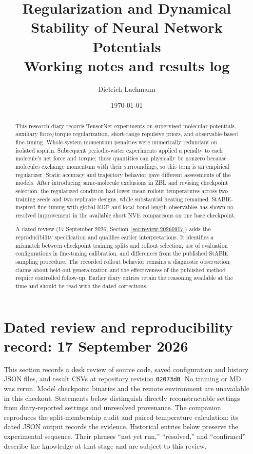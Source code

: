 \documentclass[11pt]{article}
\title{Regularization and Dynamical Stability of Neural Network
Potentials \\ \large Working notes and results log}
\author{Dietrich Lachmann}
\date{\today}
\begin{document}
\maketitle

\begin{abstract}
This research diary records TensorNet experiments on supervised molecular
potentials, auxiliary force/torque regularization, short-range repulsive
priors, and observable-based fine-tuning. Whole-system momentum penalties
were numerically redundant on isolated aspirin. Subsequent periodic-water
experiments applied a penalty to each molecule's net force and torque;
these quantities can physically be nonzero because molecules exchange
momentum with their surroundings, so this term is an empirical regularizer.
Static accuracy and trajectory behavior gave different assessments of the
models. After introducing same-molecule exclusions in ZBL and revising
checkpoint selection, the regularized condition had lower mean rollout
temperatures across two training seeds and two replicate designs, while
substantial heating remained. StABlE-inspired fine-tuning with global RDF
and local bond-length observables has shown no resolved improvement in the
available short NVE comparisons on one base checkpoint.

A dated review (17 September 2026, Section~\ref{sec:review-20260917}) adds
the reproducibility specification and qualifies earlier interpretations.
It identifies a mismatch between checkpoint training splits and rollout
selection, use of evaluation configurations in fine-tuning calibration,
and differences from the published StABlE sampling procedure. The recorded
rollout behavior remains a diagnostic observation; claims about held-out
generalization and the effectiveness of the published method require
controlled follow-up. Earlier diary entries retain the reasoning available
at the time and should be read with the dated corrections.
\end{abstract}

\tableofcontents

\section{Dated review and reproducibility record: 17 September 2026}
\label{sec:review-20260917}

This section records a desk review of source code, saved configuration and
history JSON files, and result CSVs at repository revision
\texttt{02073d0}. No training or MD was rerun. Model checkpoint binaries and
the remote environment are unavailable in this checkout. Statements below
distinguish directly reconstructable settings from diary-reported settings
and unresolved provenance. The companion
 reproduces the split-membership audit and
paired temperature calculation; its dated JSON output records the evidence.
Historical entries below preserve the experimental sequence. Their phrases
``not yet run,'' ``resolved,'' and ``confirmed'' describe the knowledge at
that stage and are subject to this review.
\end{document}
